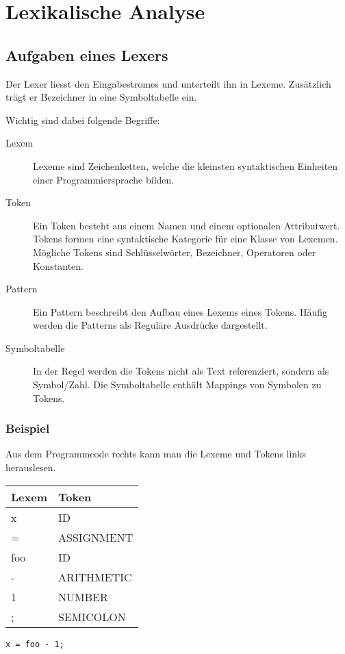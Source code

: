 \section{Lexikalische Analyse}


\subsection{Aufgaben eines Lexers}

Der Lexer liesst den Eingabestromes und unterteilt ihn in Lexeme. Zusätzlich
trägt er Bezeichner in eine Symboltabelle ein.

Wichtig sind dabei folgende Begriffe:

\begin{description}
	\item[Lexem] Lexeme sind Zeichenketten, welche die kleinsten syntaktischen
		Einheiten einer Programmiersprache bilden.
	\item[Token] Ein Token besteht aus einem Namen und einem optionalen
		Attributwert. Tokens formen eine syntaktische Kategorie für eine Klasse von
		Lexemen. Mögliche Tokens sind Schlüsselwörter, Bezeichner, Operatoren oder
		Konstanten.
	\item[Pattern] Ein Pattern beschreibt den Aufbau eines Lexems eines Tokens.
		Häufig werden die Patterns als Reguläre Ausdrücke dargestellt.
	\item[Symboltabelle] In der Regel werden die Tokens nicht als Text
		referenziert, sondern als Symbol/Zahl. Die Symboltabelle enthält Mappings
		von Symbolen zu Tokens.
\end{description}

\subsubsection*{Beispiel}

Aus dem Programmcode rechts kann man die Lexeme und Tokens links
herauslesen.

\begin{minipage}{.3\linewidth}
	\begin{tabular}[h]{|l|l|}
		\hline
		\textbf{Lexem} & \textbf{Token} \\
		\hline
		x & ID \\
		= & ASSIGNMENT \\
		foo & ID \\
		- & ARITHMETIC \\
		1 & NUMBER \\
		; & SEMICOLON \\
		\hline
	\end{tabular}
\end{minipage}
\begin{minipage}{.7\linewidth}
	\centering
	\large\texttt{x = foo - 1;}
\end{minipage}


